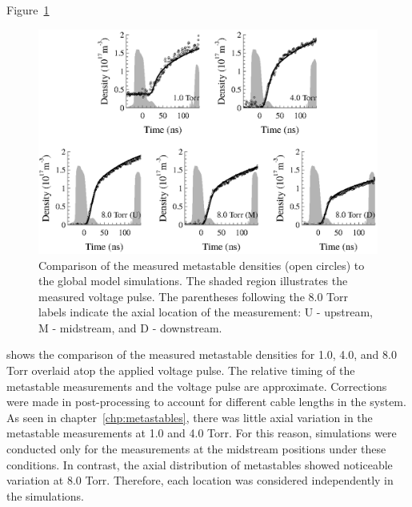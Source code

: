 Figure~\ref{fig:nmcomp}
\begin{figure}
  \centering
  \includegraphics{./chapters/modeling/figures/nmcomp.eps}
  \caption{Comparison of the measured metastable densities (open circles) to
    the global model simulations. The shaded region illustrates the measured
    voltage pulse. The parentheses following the 8.0 Torr labels indicate the
    axial location of the measurement: U - upstream, M - midstream, and D -
    downstream.}
  \label{fig:nmcomp}
\end{figure}
shows the comparison of the measured metastable densities for 1.0, 4.0, and 8.0
Torr overlaid atop the applied voltage pulse. The relative timing of the
metastable measurements and the voltage pulse are approximate. Corrections were
made in post-processing to account for different cable lengths in the system. As
seen in chapter~\ref{chp:metastables}, there was little axial variation in the
metastable measurements at 1.0 and 4.0 Torr. For this reason, simulations were
conducted only for the measurements at the midstream positions under these
conditions. In contrast, the axial distribution of metastables showed noticeable
variation at 8.0 Torr. Therefore, each location was considered independently in
the simulations.

